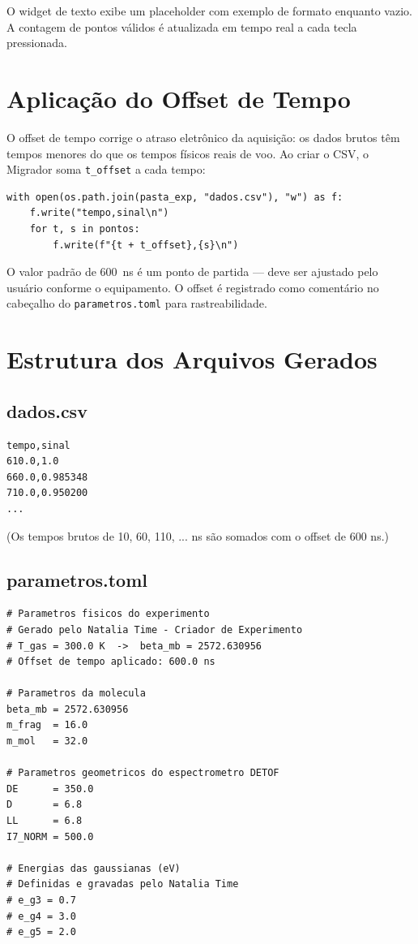 \documentclass[12pt,a4paper]{report}
\newcommand{\code}[1]{\texttt{#1}}
\begin{document}
O widget de texto exibe um placeholder com exemplo de formato enquanto vazio.
A contagem de pontos válidos é atualizada em tempo real a cada tecla pressionada.

\section{Aplicação do Offset de Tempo}

O offset de tempo corrige o atraso eletrônico da aquisição: os dados brutos
têm tempos menores do que os tempos físicos reais de voo. Ao criar o CSV,
o Migrador soma \code{t\_offset} a cada tempo:

\begin{lstlisting}[caption={Aplicação do offset ao escrever dados.csv}]
with open(os.path.join(pasta_exp, "dados.csv"), "w") as f:
    f.write("tempo,sinal\n")
    for t, s in pontos:
        f.write(f"{t + t_offset},{s}\n")
\end{lstlisting}

O valor padrão de 600~ns é um ponto de partida — deve ser ajustado pelo
usuário conforme o equipamento. O offset é registrado como comentário
no cabeçalho do \texttt{parametros.toml} para rastreabilidade.

\section{Estrutura dos Arquivos Gerados}

\subsection{dados.csv}

\begin{verbatim}
tempo,sinal
610.0,1.0
660.0,0.985348
710.0,0.950200
...
\end{verbatim}
(Os tempos brutos de 10, 60, 110, ... ns são somados com o offset de 600 ns.)

\subsection{parametros.toml}

\begin{lstlisting}[language={},caption={Estrutura do parametros.toml gerado}]
# Parametros fisicos do experimento
# Gerado pelo Natalia Time - Criador de Experimento
# T_gas = 300.0 K  ->  beta_mb = 2572.630956
# Offset de tempo aplicado: 600.0 ns

# Parametros da molecula
beta_mb = 2572.630956
m_frag  = 16.0
m_mol   = 32.0

# Parametros geometricos do espectrometro DETOF
DE      = 350.0
D       = 6.8
LL      = 6.8
I7_NORM = 500.0

# Energias das gaussianas (eV)
# Definidas e gravadas pelo Natalia Time
# e_g3 = 0.7
# e_g4 = 3.0
# e_g5 = 2.0
\end{lstlisting}
\end{document}
